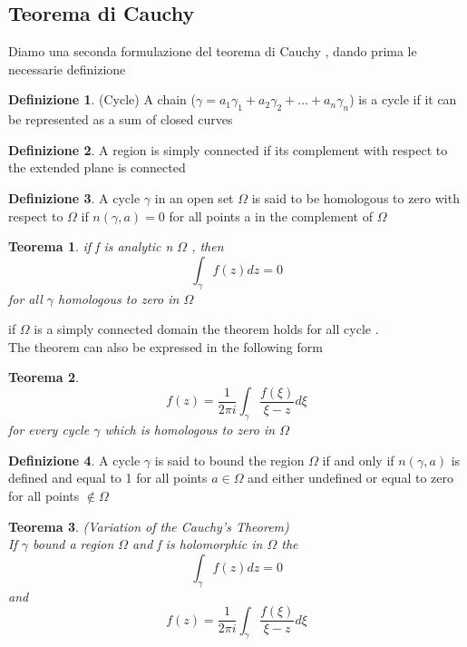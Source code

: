 \documentclass{article}
\newtheorem{teorema}{Teorema}[subsection]
\theoremstyle{definition}
\newtheorem*{definizione}{Definizione}
\begin{document}
\subsection{Teorema di Cauchy}
Diamo una seconda formulazione del teorema di Cauchy , dando prima le necessarie definizione
\begin{definizione}(Cycle)
	A chain ($\gamma=a_1\gamma_1+a_2\gamma_2+\dots+a_n\gamma_n$) is a cycle if it can be represented as a sum of  closed curves
\end{definizione}
\begin{definizione}
	A region is simply connected if its complement with  respect to the extended plane is connected 
\end{definizione}
\begin{definizione}
	A cycle $\gamma$ in an open set $\Omega$ is said to be homologous to zero with respect to $\Omega$ if $n(\gamma,a)=0$ for all points a in the complement of $\Omega$
\end{definizione}
\begin{teorema}
	if f is analytic n $\Omega$ , then $$\int_\gamma f(z)dz=0 $$ for all $\gamma$ homologous to zero in $\Omega$
\end{teorema}
if $\Omega$ is a simply connected domain the theorem holds for all cycle  . \\ The theorem can also be expressed in the following form 
\begin{teorema}
	$$f(z)=\frac{1}{2\pi i}\int_{\gamma}\frac{f(\xi)}{\xi-z}d\xi$$
for every cycle $\gamma$ which is homologous to zero in $\Omega$
\end{teorema}
\begin{definizione}
	A cycle $\gamma$ is said to bound the region $\Omega$ if and only if $n(\gamma,a)$ is defined and equal to 1 for all points $a \in \Omega$ and either undefined or equal to zero for all points $\notin \Omega$ 
\end{definizione}
\begin{teorema}(Variation of the Cauchy's Theorem) \\
	If $\gamma$ bound a region $\Omega$ and f is holomorphic in $\Omega$ the 
	$$\int_\gamma f(z)dz=0$$
	and
	$$f(z)=\frac{1}{2\pi i}\int_{\gamma}\frac{f(\xi)}{\xi-z}d\xi$$
	\
\end{teorema}
\end{document}
